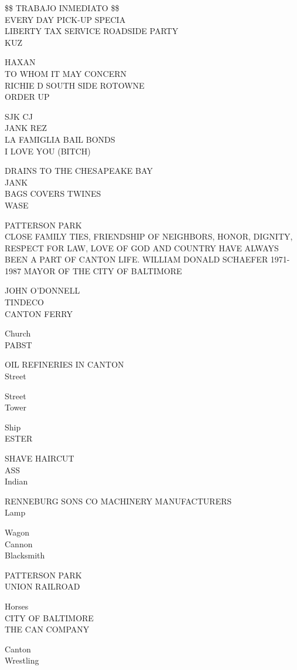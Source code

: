 \documentclass[10pt,letterpaper]{article}
\begin{document}
\$\$ TRABAJO INMEDIATO \$\$\\
EVERY DAY PICK{-}UP SPECIA\\
LIBERTY TAX SERVICE ROADSIDE PARTY\\
KUZ

HAXAN\\
TO WHOM IT MAY CONCERN\\
RICHIE D SOUTH SIDE ROTOWNE\\
ORDER UP

SJK CJ\\
JANK REZ\\
LA FAMIGLIA BAIL BONDS\\
I LOVE YOU (BITCH)

DRAINS TO THE CHESAPEAKE BAY\\
JANK\\
BAGS COVERS TWINES\\
WASE

PATTERSON PARK\\
CLOSE FAMILY TIES, FRIENDSHIP OF NEIGHBORS, HONOR, DIGNITY, RESPECT FOR LAW, LOVE OF GOD AND COUNTRY HAVE ALWAYS BEEN A PART OF CANTON LIFE.  WILLIAM DONALD SCHAEFER 1971{-}1987 MAYOR OF THE CITY OF BALTIMORE

JOHN O'DONNELL\\
TINDECO\\
CANTON FERRY

Church\\
PABST

OIL REFINERIES IN CANTON\\
Street

Street\\
Tower

Ship\\
ESTER

SHAVE HAIRCUT\\
ASS\\
Indian

RENNEBURG SONS CO MACHINERY MANUFACTURERS\\
Lamp

Wagon\\
Cannon\\
Blacksmith

PATTERSON PARK\\
UNION RAILROAD

Horses\\
CITY OF BALTIMORE\\
THE CAN COMPANY

Canton\\
Wrestling
\end{document}
